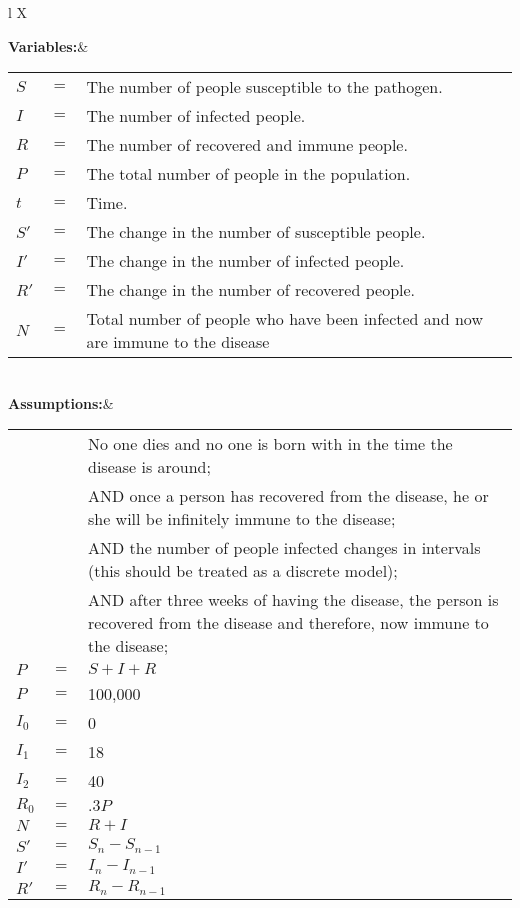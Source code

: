 \documentclass[12pt]{report}
\begin{document}
\begin{tabularx}{\linewidth}{ l X}
        
         \textbf{Variables:}&  
         
         
         \begin{tabulary}{\linewidth}[t]{LLL}
            $S$&$=$& The number of people susceptible to the pathogen.\\
            $I$&$=$& The number of infected people.\\
            $R$&$=$& The number of recovered and immune people.\\
            $P$&$=$& The total number of people in the population.\\
            $t$&$=$& Time.\\
            $S'$&$=$& The change in the number of susceptible people.\\
            $I'$&$=$& The change in the number of infected people.\\
            $R'$&$=$& The change in the number of recovered people.\\
            $N$&$=$& Total number of people who have been infected and now are immune to the disease\\
              
         \end{tabulary}
        
        \\
        
         \textbf{Assumptions:}&
         
         \begin{tabulary}{\linewidth}[t]{LLL}
              && No one dies and no one is born with in the time the disease is around;\\
              && AND once a person has recovered from the disease, he or she will be infinitely immune to the disease;\\
              && AND the number of people infected changes in intervals (this should be treated as a discrete model);\\
              && AND after three weeks of having the disease, the person is recovered from the disease and therefore, now immune to the disease; \\
              $P$&$=$&$S+I+R$\\
              $P$&$=$&100,000\\
              $I_0$&$=$&0\\
              $I_1$&$=$&18\\
              $I_2$&$=$&40\\
              $R_0$&$=$&$.3P$\\
              $N$&$=$&$R+I$\\
              $S'$&$=$&$S_n-S_{n-1}$\\
              $I'$&$=$&$I_n-I_{n-1}$\\
              $R'$&$=$&$R_n-R_{n-1}$\\
              

\end{tabulary}
\end{tabularx}
\end{document}
